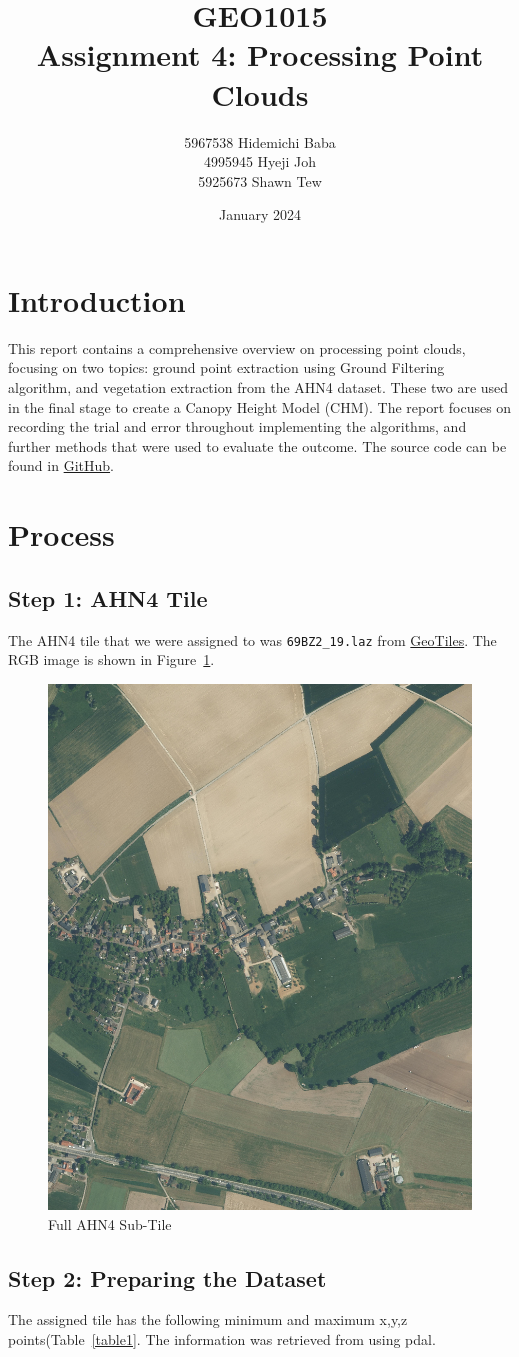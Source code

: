 \documentclass{article}
\title{\textbf{\LARGE GEO1015 \\
                \huge Assignment 4: Processing Point Clouds}}
\author{5967538 Hidemichi Baba \\
        4995945 Hyeji Joh \\
        5925673 Shawn Tew}
\date{\normalsize January 2024}
\begin{document}
\maketitle


\section{Introduction}
This report contains a comprehensive overview on processing point clouds, focusing on two topics: ground point extraction using Ground Filtering algorithm, and vegetation extraction from the AHN4 dataset. These two are used in the final stage to create a Canopy Height Model (CHM). The report focuses on recording the trial and error throughout implementing the algorithms, and further methods that were used to evaluate the outcome. The source code can be found in \href{https://github.com/HideBa/geo1015-ass4-team-bbq}{GitHub}.

\section{Process}

\subsection{Step 1: AHN4 Tile}
The AHN4 tile that we were assigned to was \texttt{69BZ2\_19.laz} from \href{https://geotiles.citg.tudelft.nl/}{GeoTiles}. The RGB image is shown in Figure~\ref{figure1}.


\begin{figure}[hbt!]
    \centering
    \includegraphics[width=0.3\linewidth]{Figures/full tile.png}
    \caption{Full AHN4 Sub-Tile}
    \label{figure1}
\end{figure}


\subsection{Step 2: Preparing the Dataset}
\noindent
The assigned tile has the following minimum and maximum x,y,z points(Table~\ref{table1}. The information was retrieved from using pdal.
\end{document}
